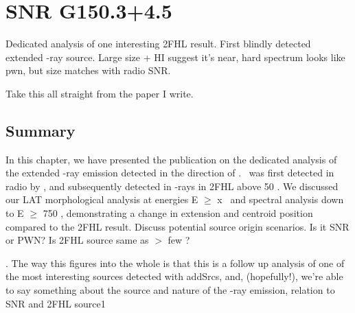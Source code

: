 \chapter{SNR G150.3+4.5}
\label{chap:G150}
Dedicated analysis  of one interesting \gls{2FHL} result. First blindly detected extended \g -ray source. Large size  + HI suggest it's near, hard spectrum looks like pwn, but size matches with radio SNR.

Take this all straight from the paper I write.


\section{\label{G150:summ}Summary} In this chapter, we have presented the publication on the dedicated analysis of the extended \g -ray emission detected in the direction of \gone. \gone ~was first detected in radio by \cite{Gao14}, and subsequently detected in \g-rays in \gls{2FHL} above 50 \gev. We discussed our \gls{LAT} morphological analysis at energies E $\geq$ x \gev~and spectral analysis down to E $\geq$ 750 \mev, demonstrating a change in extension and centroid position compared to the \gls{2FHL} result. Discuss potential source origin scenarios. Is it SNR or PWN? Is \gls{2FHL} source same as $>$ few \gev? 

. The way this figures into the whole is that  this is a follow up analysis of one of the most interesting  sources detected with addSrcs, and, (hopefully!), we're able to say something about the source and nature of the \g-ray emission, relation to SNR and \gls{2FHL} source1